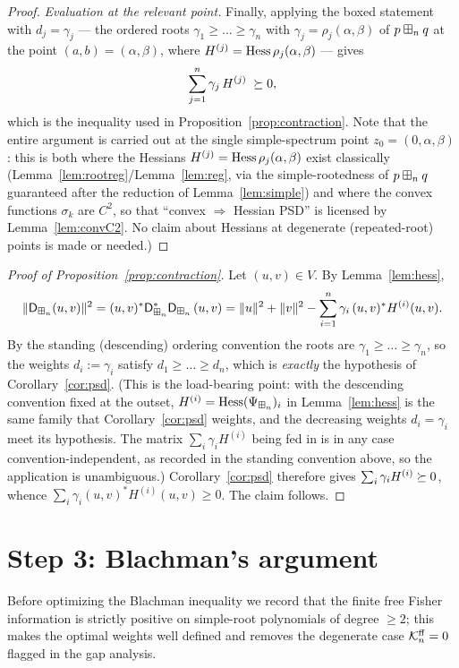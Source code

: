 \begin{proof}
\smallskip\noindent\textit{Evaluation at the relevant point.}
Finally, applying the boxed statement with $d_j=\gamma_j$ — the ordered roots
$\gamma_1\ge\dots\ge\gamma_n$ with $\gamma_j=\rho_j(\alpha,\beta)$ of $p\boxplus_n q$ at the point
$(a,b)=(\alpha,\beta)$, where $H^{(j)}=\operatorname{Hess}\rho_j(\alpha,\beta)$ — gives
\[
\sum_{j=1}^n \gamma_j\,H^{(j)}\;\succeq 0,
\]
which is the inequality used in Proposition~\ref{prop:contraction}. Note that the
entire argument is carried out at the single simple-spectrum point
$z_0=(0,\alpha,\beta)$: this is both where the Hessians $H^{(j)}=\operatorname{Hess}\rho_j(\alpha,\beta)$
exist classically (Lemma~\ref{lem:rootreg}/Lemma~\ref{lem:reg}, via the
simple-rootedness of $p\boxplus_n q$ guaranteed after the reduction of
Lemma~\ref{lem:simple}) and where the convex functions $\sigma_k$ are $C^2$, so
that ``convex $\Rightarrow$ Hessian PSD'' is licensed by Lemma~\ref{lem:convC2}.
No claim about Hessians at degenerate (repeated-root) points is made or needed.)
\end{proof}

\begin{proof}[Proof of Proposition~\ref{prop:contraction}]
Let $(u,v)\in V$. By Lemma~\ref{lem:hess},
\[
\|\mathsf{D}_{\boxplus_n}(u,v)\|^2=(u,v)^\ast \mathsf{D}_{\boxplus_n}^\ast\mathsf{D}_{\boxplus_n}\,(u,v)
=\|u\|^2+\|v\|^2-\sum_{i=1}^n\gamma_i\,(u,v)^\ast H^{(i)}(u,v).
\]
By the standing (descending) ordering convention the roots are
$\gamma_1\ge\dots\ge\gamma_n$, so the weights $d_i:=\gamma_i$ satisfy
$d_1\ge\dots\ge d_n$, which is \emph{exactly} the hypothesis of
Corollary~\ref{cor:psd}. (This is the load-bearing point: with the descending
convention fixed at the outset, $H^{(i)}=\operatorname{Hess}(\Psi_{\boxplus_n})_i$ in
Lemma~\ref{lem:hess} is the same family that Corollary~\ref{cor:psd} weights, and
the decreasing weights $d_i=\gamma_i$ meet its hypothesis. The matrix
$\sum_i\gamma_iH^{(i)}$ being fed in is in any case convention-independent, as
recorded in the standing convention above, so the application is unambiguous.)
Corollary~\ref{cor:psd} therefore gives $\sum_i\gamma_i H^{(i)}\succeq 0$,
whence $\sum_i\gamma_i(u,v)^\ast H^{(i)}(u,v)\ge0$. The claim follows.
\end{proof}

\section*{Step 3: Blachman's argument}

Before optimizing the Blachman inequality we record that the finite free Fisher
information is strictly positive on simple-root polynomials of degree $\ge2$; this
makes the optimal weights well defined and removes the degenerate case
$\mathcal{K}^{\mathrm{ff}}_n=0$ flagged in the gap analysis.

